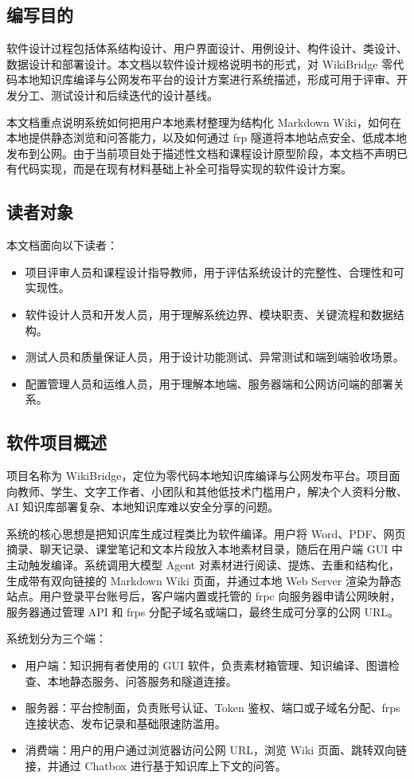 \documentclass[UTF8,a4paper,12pt,fontset=fandol]{ctexart}
\begin{document}
\subsection{编写目的}
软件设计过程包括体系结构设计、用户界面设计、用例设计、构件设计、类设计、数据设计和部署设计。本文档以软件设计规格说明书的形式，对 WikiBridge 零代码本地知识库编译与公网发布平台的设计方案进行系统描述，形成可用于评审、开发分工、测试设计和后续迭代的设计基线。

本文档重点说明系统如何把用户本地素材整理为结构化 Markdown Wiki，如何在本地提供静态浏览和问答能力，以及如何通过 frp 隧道将本地站点安全、低成本地发布到公网。由于当前项目处于描述性文档和课程设计原型阶段，本文档不声明已有代码实现，而是在现有材料基础上补全可指导实现的软件设计方案。

\subsection{读者对象}
本文档面向以下读者：
\begin{itemize}
  \item 项目评审人员和课程设计指导教师，用于评估系统设计的完整性、合理性和可实现性。
  \item 软件设计人员和开发人员，用于理解系统边界、模块职责、关键流程和数据结构。
  \item 测试人员和质量保证人员，用于设计功能测试、异常测试和端到端验收场景。
  \item 配置管理人员和运维人员，用于理解本地端、服务器端和公网访问端的部署关系。
\end{itemize}

\subsection{软件项目概述}
项目名称为 WikiBridge，定位为零代码本地知识库编译与公网发布平台。项目面向教师、学生、文字工作者、小团队和其他低技术门槛用户，解决个人资料分散、AI 知识库部署复杂、本地知识库难以安全分享的问题。

系统的核心思想是把知识库生成过程类比为软件编译。用户将 Word、PDF、网页摘录、聊天记录、课堂笔记和文本片段放入本地素材目录，随后在用户端 GUI 中主动触发编译。系统调用大模型 Agent 对素材进行阅读、提炼、去重和结构化，生成带有双向链接的 Markdown Wiki 页面，并通过本地 Web Server 渲染为静态站点。用户登录平台账号后，客户端内置或托管的 frpc 向服务器申请公网映射，服务器通过管理 API 和 frps 分配子域名或端口，最终生成可分享的公网 URL。

系统划分为三个端：
\begin{itemize}
  \item 用户端：知识拥有者使用的 GUI 软件，负责素材箱管理、知识编译、图谱检查、本地静态服务、问答服务和隧道连接。
  \item 服务器：平台控制面，负责账号认证、Token 鉴权、端口或子域名分配、frps 连接状态、发布记录和基础限速防滥用。
  \item 消费端：用户的用户通过浏览器访问公网 URL，浏览 Wiki 页面、跳转双向链接，并通过 Chatbox 进行基于知识库上下文的问答。
\end{itemize}
\end{document}
